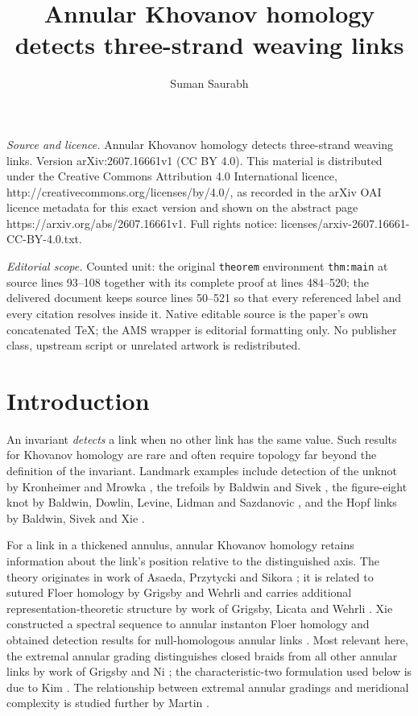 \documentclass[10pt,a4paper]{amsart}
\begin{document}
\title[Annular Khovanov homology detects three-strand weaving links]{Annular Khovanov homology detects three-strand weaving links}
\author{Suman Saurabh}
\date{}
\maketitle
\noindent\emph{Source and licence.} Annular Khovanov homology detects three-strand weaving links. Version arXiv:2607.16661v1 (CC BY 4.0). This material is distributed under the Creative Commons Attribution 4.0 International licence, http://creativecommons.org/licenses/by/4.0/, as recorded in the arXiv OAI licence metadata for this exact version and shown on the abstract page https://arxiv.org/abs/2607.16661v1. Full rights notice: licenses/arxiv-2607.16661-CC-BY-4.0.txt.\par\smallskip
\noindent\textit{Editorial scope.} Counted unit: the original \texttt{theorem} environment \texttt{thm:main} at source lines 93--108 together with its complete proof at lines 484--520; the delivered document keeps source lines 50--521 so that every referenced label and every citation resolves inside it. Native editable source is the paper's own concatenated TeX; the AMS wrapper is editorial formatting only. No publisher class, upstream script or unrelated artwork is redistributed.
\section{Introduction}

An invariant \emph{detects} a link when no other link has the same value.  Such results
for Khovanov homology \cite{Khovanov} are rare and often require topology far beyond
the definition of the invariant.  Landmark examples include detection of the unknot
by Kronheimer and Mrowka \cite{KronheimerMrowka}, the trefoils by Baldwin and Sivek
\cite{BaldwinSivek}, the figure-eight knot by Baldwin, Dowlin, Levine, Lidman and
Sazdanovic \cite{BaldwinDowlinLevineLidmanSazdanovic}, and the Hopf links by Baldwin,
Sivek and Xie \cite{BaldwinSivekXie}.

For a link in a thickened annulus, annular Khovanov homology retains information about
the link's position relative to the distinguished axis.  The theory originates in work
of Asaeda, Przytycki and Sikora \cite{APS}; it is related to sutured Floer homology by
Grigsby and Wehrli \cite{GrigsbyWehrli} and carries additional representation-theoretic
structure by work of Grigsby, Licata and Wehrli \cite{GrigsbyLicataWehrli}.  Xie
constructed a spectral sequence to annular instanton Floer homology and obtained
detection results for null-homologous annular links \cite{Xie}.  Most relevant here,
the extremal annular grading distinguishes closed braids from all other annular links
by work of Grigsby and Ni \cite{GrigsbyNi}; the characteristic-two formulation used
below is due to Kim \cite{Kim}.  The relationship between extremal annular gradings and
meridional complexity is studied further by Martin \cite{Martin}.
\end{document}
